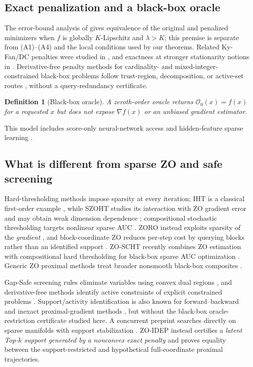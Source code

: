 \documentclass{article}
\newtheorem{definition}{Definition}
\begin{document}
\subsection{Exact penalization and a black-box oracle}
The error-bound analysis of \cite{zhao2026exact} gives equivalence of the original and penalized minimizers when $f$ is globally $K$-Lipschitz and $\lambda>K$; this premise is separate from (A1)--(A4) and the local conditions used by our theorems. Related Ky-Fan/DC penalties were studied in \cite{gotoh2018dc}, and exactness at stronger stationarity notions in \cite{yagishita2026exact}. Derivative-free penalty methods for cardinality- and mixed-integer-constrained black-box problems follow trust-region, decomposition, or active-set routes \cite{lapucci2021convergent,giuliani2022derivativefree,giovannelli2022mixed}, without a query-redundancy certificate.

\begin{definition}[Black-box oracle]
A zeroth-order oracle returns $\mathcal O_0(x)=f(x)$ for a requested $x$ but does not expose $\nabla f(x)$ or an unbiased gradient estimator.
\end{definition}

This model includes score-only neural-network access \cite{chen2017zoo,vo2024brusle} and hidden-feature sparse learning \cite{wang2026auc}.

\subsection{What is different from sparse ZO and safe screening}
Hard-thresholding methods impose sparsity at every iteration; IHT is a classical first-order example \cite{blumensath2007iht}, while SZOHT studies its interaction with ZO gradient error and may obtain weak dimension dependence \cite{devazelhes2022zeroth}; compositional stochastic thresholding targets nonlinear sparse AUC \cite{wang2026towards}. ZORO instead exploits sparsity of the \emph{gradient} \cite{cai2022zoro}, and block-coordinate ZO reduces per-step cost by querying blocks rather than an identified support \cite{cai2021zobcd}. ZO-SCHT recently combines ZO estimation with compositional hard thresholding for black-box sparse AUC optimization \cite{wang2026auc}. Generic ZO proximal methods treat broader nonsmooth black-box composites \cite{kazemi2024efficient,kungurtsev2021zeroth}.

Gap-Safe screening rules eliminate variables using convex dual regions \cite{ndiaye2017gapsafe}, and derivative-free methods identify active constraints of explicit constrained problems \cite{lewis2009active,brilli2026complexity}. Support/activity identification is also known for forward--backward and inexact proximal-gradient methods \cite{liang2017activity,dai2022inexact}, but without the black-box oracle-restriction certificate studied here. A concurrent preprint searches directly on sparse manifolds with support stabilization \cite{kimiaei2026rzcw}. ZO-IDEP instead certifies a \emph{latent Top-$k$ support generated by a nonconvex exact penalty} and proves equality between the support-restricted and hypothetical full-coordinate proximal trajectories.
\end{document}
